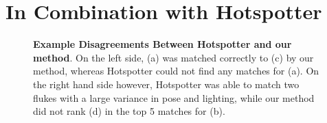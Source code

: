 




\section{In Combination with Hotspotter}

\begin{figure}[t]%
\centering
{}
\newline
{}
\caption{\textbf{Example Disagreements Between Hotspotter and our method}. On the left side, (a) was matched correctly to (c) by our method, whereas Hotspotter could not find any matches for (a). On the right hand side however, Hotspotter was able to match two flukes with a large variance in pose and lighting, while our method did not rank (d) in the top 5 matches for (b).}
\label{fig:dis_proot}
\end{figure}



